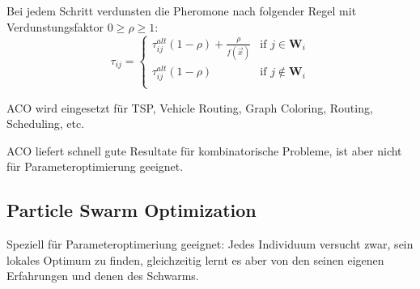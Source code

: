   Bei jedem Schritt verdunsten die Pheromone nach folgender Regel mit Verdunstungsfaktor $0 \geq \rho \geq 1$:
  $$\tau_{ij} = \begin{cases}
    \tau_{ij}^{alt} (1-\rho) + \frac{\rho}{f(\vec{x})} & \text{if } j \in \mathbf{W}_i\\
    \tau_{ij}^{alt} (1-\rho) & \text{if } j \notin \mathbf{W}_i\\
  \end{cases}$$
  
  ACO wird eingesetzt für TSP, Vehicle Routing, Graph Coloring, Routing, Scheduling, etc.
  
  ACO liefert schnell gute Resultate für kombinatorische Probleme, ist aber nicht für Parameteroptimierung geeignet.
  
  
  
\subsection{Particle Swarm Optimization }
  Speziell für Parameteroptimeriung geeignet: Jedes Individuum versucht zwar, sein lokales Optimum zu finden, gleichzeitig lernt es aber von den seinen eigenen Erfahrungen und denen des Schwarms.
  
  
  
  

